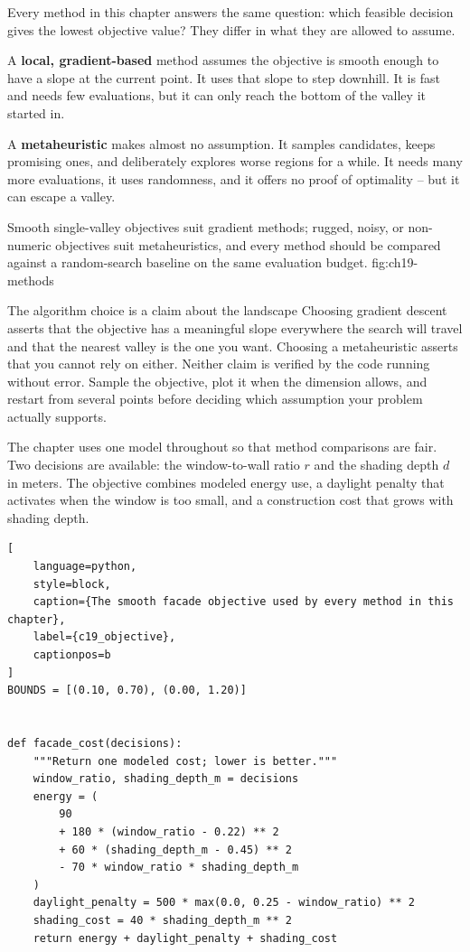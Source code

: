 
Every method in this chapter answers the same question: which feasible decision
gives the lowest objective value? They differ in what they are allowed to
assume.

A \textbf{local, gradient-based} method assumes the objective is smooth enough
to have a slope at the current point. It uses that slope to step downhill. It is
fast and needs few evaluations, but it can only reach the bottom of the valley
it started in.

A \textbf{metaheuristic} makes almost no assumption. It samples candidates,
keeps promising ones, and deliberately explores worse regions for a while. It
needs many more evaluations, it uses randomness, and it offers no proof of
optimality -- but it can escape a valley.

{Smooth single-valley objectives suit gradient methods; rugged, noisy, or non-numeric objectives suit metaheuristics, and every method should be compared against a random-search baseline on the same evaluation budget.}
{fig:ch19-methods}

\begin{ExplainBox}{The algorithm choice is a claim about the landscape}
Choosing gradient descent asserts that the objective has a meaningful slope
everywhere the search will travel and that the nearest valley is the one you
want. Choosing a metaheuristic asserts that you cannot rely on either. Neither
claim is verified by the code running without error. Sample the objective, plot
it when the dimension allows, and restart from several points before deciding
which assumption your problem actually supports.
\end{ExplainBox}


The chapter uses one model throughout so that method comparisons are fair. Two
decisions are available: the window-to-wall ratio $r$ and the shading depth $d$
in meters. The objective combines modeled energy use, a daylight penalty that
activates when the window is too small, and a construction cost that grows with
shading depth.

\begin{lstlisting}[
    language=python,
    style=block,
    caption={The smooth facade objective used by every method in this chapter},
    label={c19_objective},
    captionpos=b
]
BOUNDS = [(0.10, 0.70), (0.00, 1.20)]


def facade_cost(decisions):
    """Return one modeled cost; lower is better."""
    window_ratio, shading_depth_m = decisions
    energy = (
        90
        + 180 * (window_ratio - 0.22) ** 2
        + 60 * (shading_depth_m - 0.45) ** 2
        - 70 * window_ratio * shading_depth_m
    )
    daylight_penalty = 500 * max(0.0, 0.25 - window_ratio) ** 2
    shading_cost = 40 * shading_depth_m ** 2
    return energy + daylight_penalty + shading_cost
\end{lstlisting}

